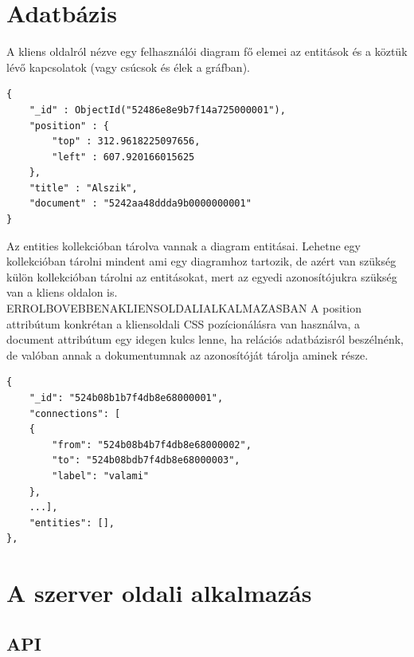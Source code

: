 \section{Adatbázis}

A kliens oldalról nézve egy felhasználói diagram fő elemei az entitások és a köztük lévő kapcsolatok (vagy csúcsok és élek a gráfban). 


\begin{lstlisting}
{
    "_id" : ObjectId("52486e8e9b7f14a725000001"),
    "position" : {
        "top" : 312.9618225097656,
        "left" : 607.920166015625
    },
    "title" : "Alszik",
    "document" : "5242aa48ddda9b0000000001"
}
\end{lstlisting}

Az entities kollekcióban tárolva vannak a diagram entitásai. Lehetne egy kollekcióban tárolni mindent ami egy diagramhoz tartozik, de azért van szükség külön kollekcióban tárolni az entitásokat, mert az egyedi azonosítójukra szükség van a kliens oldalon is. ERROLBOVEBBENAKLIENSOLDALIALKALMAZASBAN
A position attribútum konkrétan a kliensoldali CSS pozícionálásra van használva, a document attribútum egy idegen kulcs lenne, ha relációs adatbázisról beszélnénk, de valóban annak a dokumentumnak az azonosítóját tárolja aminek része.

\begin{lstlisting}
{
    "_id": "524b08b1b7f4db8e68000001",
    "connections": [
    {
        "from": "524b08b4b7f4db8e68000002",
        "to": "524b08bdb7f4db8e68000003",
        "label": "valami"
    },
    ...],
    "entities": [],
},
\end{lstlisting}


\section{A szerver oldali alkalmazás}

\subsection{API}

